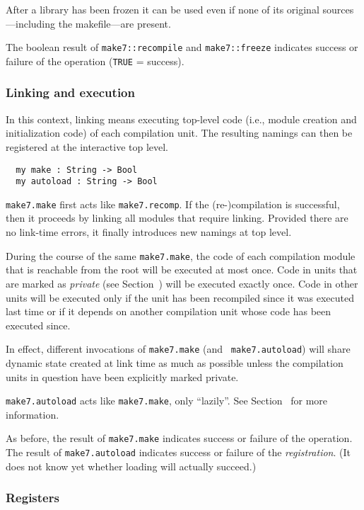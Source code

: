 After a library has been frozen it can be used even if none of its
original sources---including the makefile---are present.

The boolean result of {\tt make7::recompile} and {\tt make7::freeze} indicates
success or failure of the operation ({\tt TRUE} = success).

\subsubsection{Linking and execution}

In this context, linking means executing top-level code (i.e., module
creation and initialization code) of each compilation unit.  The
resulting namings can then be registered at the interactive top
level.

\begin{verbatim}
  my make : String -> Bool
  my autoload : String -> Bool
\end{verbatim}

{\tt make7.make} first acts like {\tt make7.recomp}.  If the
(re-)compilation is successful, then it proceeds by linking all
modules that require linking.  Provided there are no link-time errors,
it finally introduces new namings at top level.

During the course of the same {\tt make7.make}, the code of each
compilation module that is reachable from the root will be executed at
most once.  Code in units that are marked as {\it private} (see
Section~) will be executed exactly once.  Code in
other units will be executed only if the unit has been recompiled
since it was executed last time or if it depends on another
compilation unit whose code has been executed since.

In effect, different invocations of {\tt make7.make} (and {\tt
make7.autoload}) will share dynamic state created at link time as much as
possible unless the compilation units in question have been explicitly
marked private.

{\tt make7.autoload} acts like {\tt make7.make}, only ``lazily''. See
Section~ for more information.

As before, the result of {\tt make7.make} indicates success or failure of
the operation.  The result of {\tt make7.autoload} indicates success or
failure of the {\em registration}.  (It does not know yet whether
loading will actually succeed.)

\subsubsection{Registers}
\label{sec:registers}

